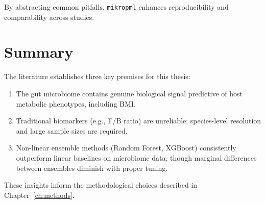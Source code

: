 By abstracting common pitfalls, \texttt{mikropml} enhances reproducibility and comparability across studies.

\section{Summary}

The literature establishes three key premises for this thesis:

\begin{enumerate}
    \item The gut microbiome contains genuine biological signal predictive of host metabolic phenotypes, including BMI.
    \item Traditional biomarkers (e.g., F/B ratio) are unreliable; species-level resolution and large sample sizes are required.
    \item Non-linear ensemble methods (Random Forest, XGBoost) consistently outperform linear baselines on microbiome data, though marginal differences between ensembles diminish with proper tuning.
\end{enumerate}

These insights inform the methodological choices described in Chapter~\ref{ch:methods}.

